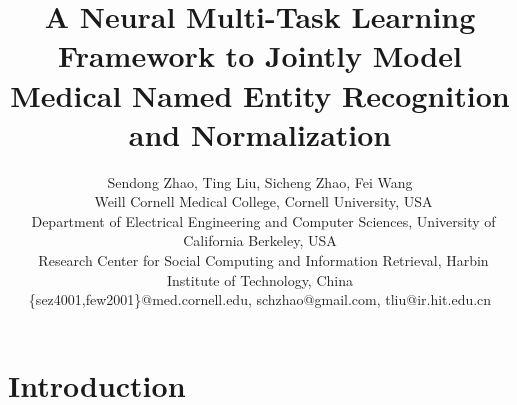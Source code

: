 \documentclass[letterpaper]{article} %
\begin{document}
 


\title{A Neural Multi-Task Learning Framework to Jointly Model \\Medical Named Entity Recognition and Normalization}


\author{
	Sendong Zhao\footnotemark[1], Ting Liu\footnotemark[3], Sicheng Zhao\footnotemark[2], Fei Wang\footnotemark[1]\\ 
	\footnotemark[1]~Weill Cornell Medical College, Cornell University, USA\\
	\footnotemark[2]~Department of Electrical Engineering and Computer Sciences, University of California Berkeley, USA\\
	\footnotemark[3]~Research Center for Social Computing and Information Retrieval, Harbin Institute of Technology, China  \\
	\{sez4001,few2001\}@med.cornell.edu, schzhao@gmail.com, tliu@ir.hit.edu.cn
}


\maketitle
\begin{abstract}

\end{abstract}

\section{Introduction}
\label{sec:intro}

\end{document}
